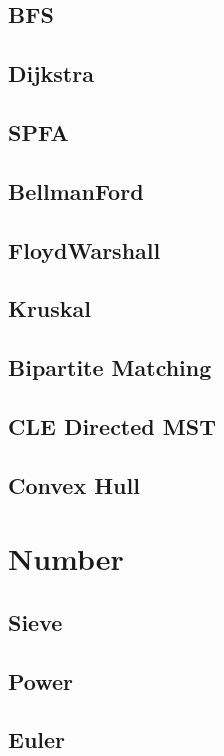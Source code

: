 \subsection{BFS}


\subsection{Dijkstra}


\subsection{SPFA}


\subsection{BellmanFord}


\subsection{FloydWarshall}


\subsection{Kruskal}


\subsection{Bipartite Matching}


\subsection{CLE Directed MST}


\subsection{Convex Hull}

\section{Number}

\subsection{Sieve}


\subsection{Power}


\subsection{Euler}

